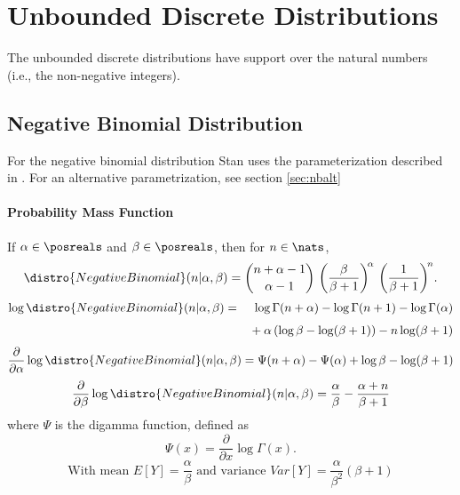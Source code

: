 \begin{description}
%
\end{description}



\chapter{Unbounded Discrete Distributions}

\noindent
The unbounded discrete distributions have support over the natural
numbers (i.e., the non-negative integers).


\section{Negative Binomial Distribution}

For the negative binomial distribution Stan uses the parameterization
described in \citet{GelmanEtAl:2013}.
For an alternative parametrization, see section \ref{sec:nbalt}

\subsubsection{Probability Mass Function}

If $\alpha \in \posreals$ and $\beta \in \posreals$, then for $n \in
\nats$,
\[
\distro{NegativeBinomial}(n|\alpha,\beta)
 = 
\binom{n + \alpha - 1}{\alpha - 1}
\,
\left( \frac{\beta}{\beta+1} \right)^{\!\alpha}
\,
\left( \frac{1}{\beta + 1} \right)^{\!n} \!.
\]
\begin{eqnarray*}
\log \distro{NegativeBinomial}(n|\alpha,\beta)
& = & \log \Gamma(n + \alpha) 
  - \log \Gamma(n + 1)
  - \log \Gamma(\alpha)
\\[4pt]
& & 
  {} + \alpha \left(\log \beta - \log (\beta + 1) \right)
  - n \log (\beta + 1)
\end{eqnarray*}
\[
\frac{\partial}{\partial \alpha} 
\log \distro{NegativeBinomial}(n|\alpha,\beta)
= \Psi(n + \alpha)
- \Psi(\alpha)
+ \log \beta
- \log (\beta + 1)
\]
\[
\frac{\partial}{\partial \beta} 
\log \distro{NegativeBinomial}(n|\alpha,\beta)
= \frac{\alpha}{\beta} - \frac{\alpha + n}{\beta + 1}
\]
where $\Psi$ is the digamma function, defined as
\[
\Psi(x) = \frac{\partial}{\partial x} \log \Gamma(x).
\]
\[
\mbox{With mean } E[Y] = \frac{\alpha}{\beta} \mbox{ and variance } Var[Y] =
\frac{\alpha}{\beta^2} (\beta + 1)
\]

